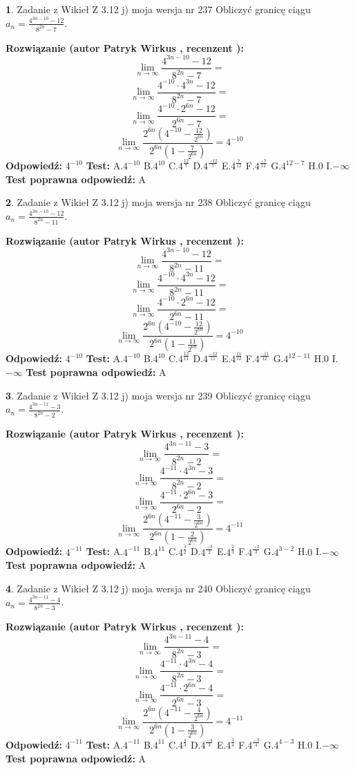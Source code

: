 \documentclass[12pt, a4paper]{article}
\theoremstyle{definition} %
\newtheorem{zad}{}
\newcommand{\zadStart}[1]{\begin{zad}#1\newline}
\newcommand{\zadStop}{\end{zad}}
\newcommand{\rozwStart}[2]{\noindent \textbf{Rozwiązanie (autor #1 , recenzent #2): }\newline}
\newcommand{\rozwStop}{\newline}
\newcommand{\odpStart}{\noindent \textbf{Odpowiedź:}\newline}
\newcommand{\odpStop}{\newline}
\newcommand{\testStart}{\noindent \textbf{Test:}\newline}
\newcommand{\testStop}{\newline}
\newcommand{\kluczStart}{\noindent \textbf{Test poprawna odpowiedź:}\newline}
\newcommand{\kluczStop}{\newline}
\begin{document}
\zadStart{Zadanie z Wikieł Z 3.12 j) moja wersja nr 237}
Obliczyć granicę ciągu $a_{n}=\frac{4^{3n-10}-12}{8^{2n}-7}$.
\zadStop
\rozwStart{Patryk Wirkus}{}
$$\lim\limits_{n\to\infty}\frac{4^{3n-10}-12}{8^{2n}-7}=$$
$$\lim\limits_{n\to\infty}\frac{4^{-10} \cdot 4^{3n}-12}{8^{2n}-7}=$$
$$\lim\limits_{n\to\infty}\frac{4^{-10} \cdot 2^{6n}-12}{2^{6n}-7}=$$
$$\lim\limits_{n\to\infty}\frac{2^{6n}(4^{-10} - \frac{12}{2^{6n}})}{2^{6n}(1-\frac{7}{2^{6n}})}= 4^{-10}$$
\rozwStop
\odpStart
$4^{-10}$
\odpStop
\testStart
A.$4^{-10}$
B.$4^{10}$
C.$4^{\frac{12}{7}}$
D.$4^{\frac{-12}{7}}$
E.$4^{\frac{7}{12}}$
F.$4^{\frac{-7}{12}}$
G.$4^{12-7}$
H.$0$
I.$-\infty$
\testStop
\kluczStart
A
\kluczStop



\zadStart{Zadanie z Wikieł Z 3.12 j) moja wersja nr 238}
Obliczyć granicę ciągu $a_{n}=\frac{4^{3n-10}-12}{8^{2n}-11}$.
\zadStop
\rozwStart{Patryk Wirkus}{}
$$\lim\limits_{n\to\infty}\frac{4^{3n-10}-12}{8^{2n}-11}=$$
$$\lim\limits_{n\to\infty}\frac{4^{-10} \cdot 4^{3n}-12}{8^{2n}-11}=$$
$$\lim\limits_{n\to\infty}\frac{4^{-10} \cdot 2^{6n}-12}{2^{6n}-11}=$$
$$\lim\limits_{n\to\infty}\frac{2^{6n}(4^{-10} - \frac{12}{2^{6n}})}{2^{6n}(1-\frac{11}{2^{6n}})}= 4^{-10}$$
\rozwStop
\odpStart
$4^{-10}$
\odpStop
\testStart
A.$4^{-10}$
B.$4^{10}$
C.$4^{\frac{12}{11}}$
D.$4^{\frac{-12}{11}}$
E.$4^{\frac{11}{12}}$
F.$4^{\frac{-11}{12}}$
G.$4^{12-11}$
H.$0$
I.$-\infty$
\testStop
\kluczStart
A
\kluczStop



\zadStart{Zadanie z Wikieł Z 3.12 j) moja wersja nr 239}
Obliczyć granicę ciągu $a_{n}=\frac{4^{3n-11}-3}{8^{2n}-2}$.
\zadStop
\rozwStart{Patryk Wirkus}{}
$$\lim\limits_{n\to\infty}\frac{4^{3n-11}-3}{8^{2n}-2}=$$
$$\lim\limits_{n\to\infty}\frac{4^{-11} \cdot 4^{3n}-3}{8^{2n}-2}=$$
$$\lim\limits_{n\to\infty}\frac{4^{-11} \cdot 2^{6n}-3}{2^{6n}-2}=$$
$$\lim\limits_{n\to\infty}\frac{2^{6n}(4^{-11} - \frac{3}{2^{6n}})}{2^{6n}(1-\frac{2}{2^{6n}})}= 4^{-11}$$
\rozwStop
\odpStart
$4^{-11}$
\odpStop
\testStart
A.$4^{-11}$
B.$4^{11}$
C.$4^{\frac{3}{2}}$
D.$4^{\frac{-3}{2}}$
E.$4^{\frac{2}{3}}$
F.$4^{\frac{-2}{3}}$
G.$4^{3-2}$
H.$0$
I.$-\infty$
\testStop
\kluczStart
A
\kluczStop



\zadStart{Zadanie z Wikieł Z 3.12 j) moja wersja nr 240}
Obliczyć granicę ciągu $a_{n}=\frac{4^{3n-11}-4}{8^{2n}-3}$.
\zadStop
\rozwStart{Patryk Wirkus}{}
$$\lim\limits_{n\to\infty}\frac{4^{3n-11}-4}{8^{2n}-3}=$$
$$\lim\limits_{n\to\infty}\frac{4^{-11} \cdot 4^{3n}-4}{8^{2n}-3}=$$
$$\lim\limits_{n\to\infty}\frac{4^{-11} \cdot 2^{6n}-4}{2^{6n}-3}=$$
$$\lim\limits_{n\to\infty}\frac{2^{6n}(4^{-11} - \frac{4}{2^{6n}})}{2^{6n}(1-\frac{3}{2^{6n}})}= 4^{-11}$$
\rozwStop
\odpStart
$4^{-11}$
\odpStop
\testStart
A.$4^{-11}$
B.$4^{11}$
C.$4^{\frac{4}{3}}$
D.$4^{\frac{-4}{3}}$
E.$4^{\frac{3}{4}}$
F.$4^{\frac{-3}{4}}$
G.$4^{4-3}$
H.$0$
I.$-\infty$
\testStop
\kluczStart
A
\kluczStop
\end{document}
